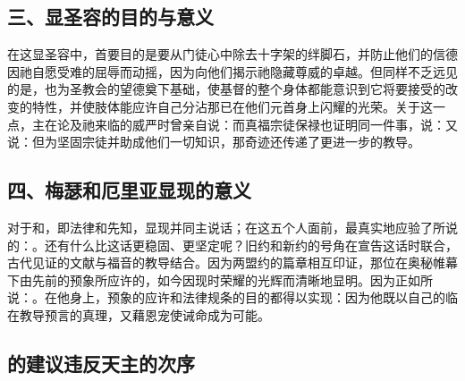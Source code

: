 
\subsection{三、显圣容的目的与意义}

在这显圣容中，首要目的是要从门徒心中除去十字架的绊脚石，并防止他们的信德因祂自愿受难的屈辱而动摇，因为向他们揭示祂隐藏尊威的卓越。但同样不乏远见的是，也为圣教会的望德奠下基础，使基督的整个身体都能意识到它将要接受的改变的特性，并使肢体能应许自己分沾那已在他们元首身上闪耀的光荣。关于这一点，主在论及祂来临的威严时曾亲自说：而真福宗徒保禄也证明同一件事，说：又说：但为坚固宗徒并助成他们一切知识，那奇迹还传递了更进一步的教导。\par


\subsection{四、梅瑟和厄里亚显现的意义}

对于和，即法律和先知，显现并同主说话；在这五个人面前，最真实地应验了所说的：。还有什么比这话更稳固、更坚定呢？旧约和新约的号角在宣告这话时联合，古代见证的文献与福音的教导结合。因为两盟约的篇章相互印证，那位在奥秘帷幕下由先前的预象所应许的，如今因现时荣耀的光辉而清晰地显明。因为正如所说：。在他身上，预象的应许和法律规条的目的都得以实现：因为他既以自己的临在教导预言的真理，又藉恩宠使诫命成为可能。\par


\subsection{的建议违反天主的次序}

